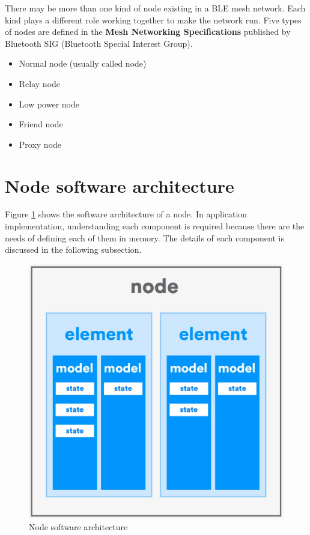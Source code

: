 \documentclass[\main/main.tex]{subfiles}
\begin{document}
There may be more than one kind of node existing in a BLE mesh network. Each kind plays a different role working together to make the network run. Five types of nodes are defined in the \textbf{Mesh Networking Specifications} published by Bluetooth SIG (Bluetooth Special Interest Group).
\begin{itemize}
    \item Normal node (usually called node)
    \item Relay node
    \item Low power node
    \item Friend node
    \item Proxy node
\end{itemize}
\section{Node software architecture}
Figure \ref{fig:Node software architecture} shows the software architecture of a node. In application implementation, understanding each component is required because there are the needs of defining each of them in memory. The details of each component is discussed in the following subsection.
\begin{figure}[H]
    \begin{center}
        \includegraphics[scale=0.15]{node_software_architecture.jpg}
    \end{center}
    \caption{Node software architecture}
    \label{fig:Node software architecture}
\end{figure}
\end{document}
